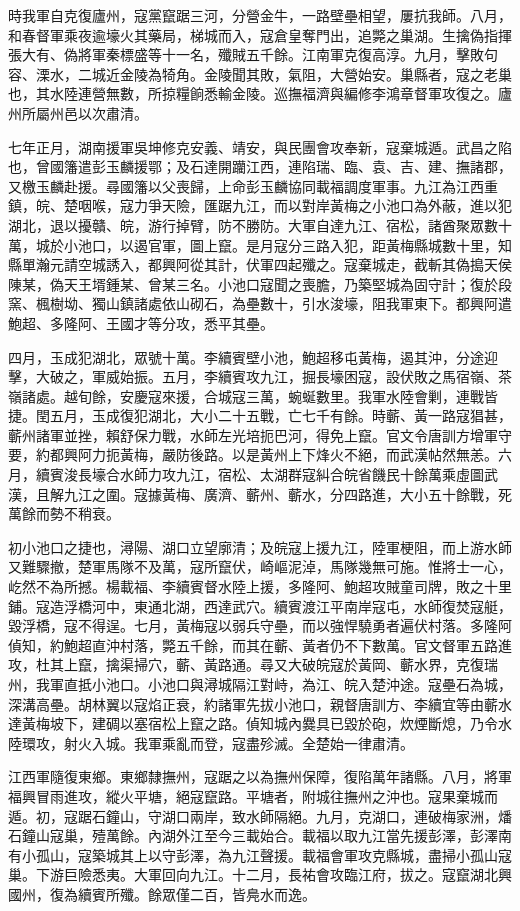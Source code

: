 \begin{pinyinscope}
時我軍自克復廬州，寇黨竄踞三河，分營金牛，一路壁壘相望，屢抗我師。八月，和春督軍乘夜逾壕火其藥局，梯城而入，寇倉皇奪門出，追斃之巢湖。生擒偽指揮張大有、偽將軍秦標盛等十一名，殲賊五千餘。江南軍克復高淳。九月，擊敗句容、溧水，二城近金陵為犄角。金陵聞其敗，氣阻，大營始安。巢縣者，寇之老巢也，其水陸連營無數，所掠糧餉悉輸金陵。巡撫福濟與編修李鴻章督軍攻復之。廬州所屬州邑以次肅清。

七年正月，湖南援軍吳坤修克安義、靖安，與民團會攻奉新，寇棄城遁。武昌之陷也，曾國籓遣彭玉麟援鄂；及石達開躪江西，連陷瑞、臨、袁、吉、建、撫諸郡，又檄玉麟赴援。尋國籓以父喪歸，上命彭玉麟協同載福調度軍事。九江為江西重鎮，皖、楚咽喉，寇力爭天險，匯踞九江，而以對岸黃梅之小池口為外蔽，進以犯湖北，退以擾贛、皖，游行掉臂，防不勝防。大軍自達九江、宿松，諸酋聚眾數十萬，城於小池口，以遏官軍，圖上竄。是月寇分三路入犯，距黃梅縣城數十里，知縣單瀚元請空城誘入，都興阿從其計，伏軍四起殲之。寇棄城走，截斬其偽搗天侯陳某，偽天王壻鍾某、曾某三名。小池口寇聞之喪膽，乃築堅城為固守計；復於段窯、楓樹坳、獨山鎮諸處依山砌石，為壘數十，引水浚壕，阻我軍東下。都興阿遣鮑超、多隆阿、王國才等分攻，悉平其壘。

四月，玉成犯湖北，眾號十萬。李續賓壁小池，鮑超移屯黃梅，遏其沖，分途迎擊，大破之，軍威始振。五月，李續賓攻九江，掘長壕困寇，設伏敗之馬宿嶺、茶嶺諸處。越旬餘，安慶寇來援，合城寇三萬，蜿蜒數里。我軍水陸會剿，連戰皆捷。閏五月，玉成復犯湖北，大小二十五戰，亡七千有餘。時蘄、黃一路寇猖甚，蘄州諸軍並挫，賴舒保力戰，水師左光培扼巴河，得免上竄。官文令唐訓方增軍守要，約都興阿力扼黃梅，嚴防後路。以是黃州上下烽火不絕，而武漢帖然無恙。六月，續賓浚長壕合水師力攻九江，宿松、太湖群寇糾合皖省饑民十餘萬乘虛圖武漢，且解九江之圍。寇據黃梅、廣濟、蘄州、蘄水，分四路進，大小五十餘戰，死萬餘而勢不稍衰。

初小池口之捷也，潯陽、湖口立望廓清；及皖寇上援九江，陸軍梗阻，而上游水師又難驟撤，楚軍馬隊不及萬，寇所竄伏，崎嶇泥淖，馬隊幾無可施。惟將士一心，屹然不為所撼。楊載福、李續賓督水陸上援，多隆阿、鮑超攻賊童司牌，敗之十里鋪。寇造浮橋河中，東通北湖，西達武穴。續賓渡江平南岸寇屯，水師復焚寇艇，毀浮橋，寇不得逞。七月，黃梅寇以弱兵守壘，而以強悍驍勇者遍伏村落。多隆阿偵知，約鮑超直沖村落，斃五千餘，而其在蘄、黃者仍不下數萬。官文督軍五路進攻，杜其上竄，擒渠掃穴，蘄、黃路通。尋又大破皖寇於黃岡、蘄水界，克復瑞州，我軍直抵小池口。小池口與潯城隔江對峙，為江、皖入楚沖途。寇壘石為城，深溝高壘。胡林翼以寇焰正衰，約諸軍先拔小池口，親督唐訓方、李續宜等由蘄水達黃梅坡下，建碉以塞宿松上竄之路。偵知城內爨具已毀於砲，炊煙斷熄，乃令水陸環攻，射火入城。我軍乘亂而登，寇盡殄滅。全楚始一律肅清。

江西軍隨復東鄉。東鄉隸撫州，寇踞之以為撫州保障，復陷萬年諸縣。八月，將軍福興冒雨進攻，縱火平塘，絕寇竄路。平塘者，附城往撫州之沖也。寇果棄城而遁。初，寇踞石鐘山，守湖口兩岸，致水師隔絕。九月，克湖口，連破梅家洲，燔石鐘山寇巢，殪萬餘。內湖外江至今三載始合。載福以取九江當先援彭澤，彭澤南有小孤山，寇築城其上以守彭澤，為九江聲援。載福會軍攻克縣城，盡掃小孤山寇巢。下游巨險悉夷。大軍回向九江。十二月，長祐會攻臨江府，拔之。寇竄湖北興國州，復為續賓所殲。餘眾僅二百，皆鳧水而逸。


\end{pinyinscope}

